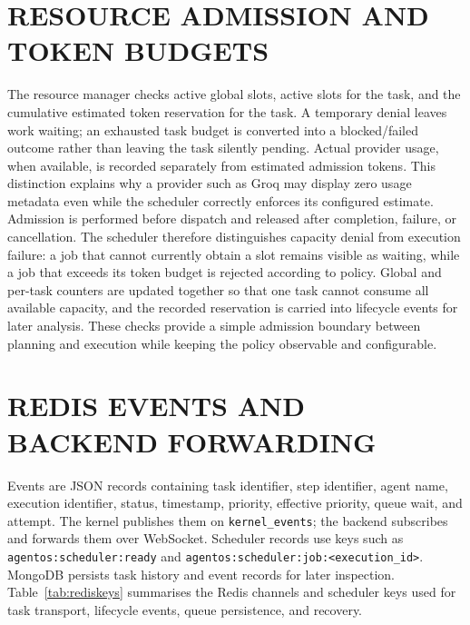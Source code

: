 \section{\uppercase{Resource Admission and Token Budgets}}
The resource manager checks active global slots, active slots for the task, and the cumulative estimated token reservation for the task. A temporary denial leaves work waiting; an exhausted task budget is converted into a blocked/failed outcome rather than leaving the task silently pending. Actual provider usage, when available, is recorded separately from estimated admission tokens. This distinction explains why a provider such as Groq may display zero usage metadata even while the scheduler correctly enforces its configured estimate.
Admission is performed before dispatch and released after completion, failure, or cancellation. The scheduler therefore distinguishes capacity denial from execution failure: a job that cannot currently obtain a slot remains visible as waiting, while a job that exceeds its token budget is rejected according to policy. Global and per-task counters are updated together so that one task cannot consume all available capacity, and the recorded reservation is carried into lifecycle events for later analysis. These checks provide a simple admission boundary between planning and execution while keeping the policy observable and configurable.

\section{\uppercase{Redis Events and Backend Forwarding}}
Events are JSON records containing task identifier, step identifier, agent name, execution identifier, status, timestamp, priority, effective priority, queue wait, and attempt. The kernel publishes them on \texttt{kernel\_events}; the backend subscribes and forwards them over WebSocket. Scheduler records use keys such as \texttt{agentos:scheduler:ready} and \texttt{agentos:scheduler:job:<execution\_id>}. MongoDB persists task history and event records for later inspection.
Table~\ref{tab:rediskeys} summarises the Redis channels and scheduler keys used for task transport, lifecycle events, queue persistence, and recovery.

